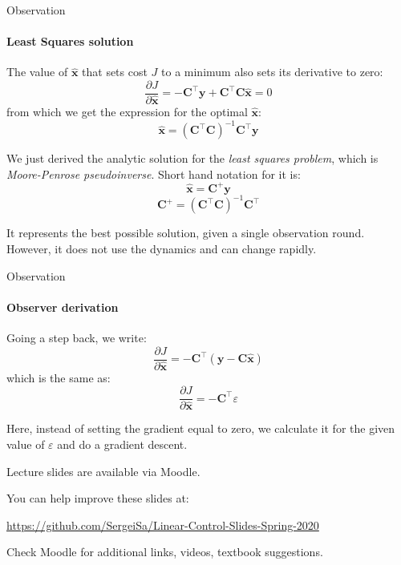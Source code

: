 \documentclass{beamer}
\begin{document}
\begin{frame}{Observation}
\framesubtitle{Least Squares solution}
\begin{flushleft}

The value of $\hat{\mathbf x}$ that sets cost $J$ to a minimum also sets its derivative to zero:
%
\[
\frac{\partial J}{\partial \hat{\mathbf x}} = 
-\mathbf C^\top \mathbf y + 
\mathbf C^\top \mathbf C \hat{\mathbf x} = 0
\]
%
from which we get the expression for the optimal $\hat{\mathbf x}$:
%
\[
 \hat{\mathbf x} = (\mathbf C^\top \mathbf C)^{-1} \mathbf C^\top \mathbf y
\]

We just derived the analytic solution for the \emph{least squares problem}, which is \emph{Moore-Penrose pseudoinverse}. Short hand notation for it is:
%
\[
 \hat{\mathbf x} = \mathbf C^+ \mathbf y
\]
\[
\mathbf C^+ =  (\mathbf C^\top \mathbf C)^{-1} \mathbf C^\top
\]

It represents the best possible solution, given a single observation round. However, it does not use the dynamics and can change rapidly.


\end{flushleft}
\end{frame}

\begin{frame}{Observation}
\framesubtitle{Observer derivation}
\begin{flushleft}

Going a step back, we write:
%
\[
\frac{\partial J}{\partial \hat{\mathbf x}} = 
-\mathbf C^\top (\mathbf y - 
\mathbf C \hat{\mathbf x})
\]
%
which is the same as:
%
\[
\frac{\partial J}{\partial \hat{\mathbf x}} = -\mathbf C^\top \varepsilon
\]

Here, instead of setting the gradient equal to zero, we calculate it for the given value of $\varepsilon$ and do a gradient descent.

\end{flushleft}
\end{frame}


\begin{frame}
\centerline{Lecture slides are available via Moodle.}
\bigskip
\centerline{You can help improve these slides at:}
\centerline{\url{https://github.com/SergeiSa/Linear-Control-Slides-Spring-2020}}
\bigskip
\centerline{Check Moodle for additional links, videos, textbook suggestions.}
\end{frame}
\end{document}
